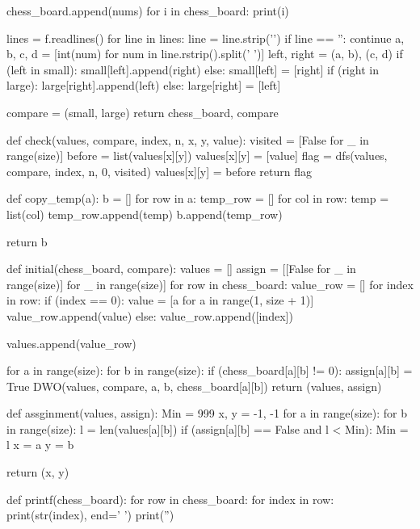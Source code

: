 ﻿\documentclass[a4paper, 11pt]{article}
\begin{document}
\begin{python}
        chess_board.append(nums)
    for i in chess_board:
        print(i)

    lines = f.readlines()
    for line in lines:
        line = line.strip('\n')
        if line == '':
            continue
        a, b, c, d = [int(num) for num in line.rstrip().split(' ')]
        left, right = (a, b), (c, d)
        if (left in small):
            small[left].append(right)
        else:
            small[left] = [right]
        if (right in large):
            large[right].append(left)
        else:
               large[right] = [left]

    compare = (small, large)
    return chess_board, compare


def check(values, compare, index, n, x, y, value):
    visited = [False for _ in range(size)]
    before = list(values[x][y])
    values[x][y] = [value]
    flag = dfs(values, compare, index, n, 0, visited)
    values[x][y] = before
    return flag



def copy_temp(a):
    b = []
    for row in a:
        temp_row = []
        for col in row:
            temp = list(col)
            temp_row.append(temp)
        b.append(temp_row)

    return b


def initial(chess_board, compare):
    values = []
    assign = [[False for _ in range(size)] for _ in range(size)]
    for row in chess_board:
        value_row = []
        for index in row:
            if (index == 0):
                value = [a for a in range(1, size + 1)]
                value_row.append(value)
            else:
                value_row.append([index])

        values.append(value_row)

    for a in range(size):
        for b in range(size):
            if (chess_board[a][b] != 0):
                assign[a][b] = True
                DWO(values, compare, a, b, chess_board[a][b])
    return (values, assign)


def assginment(values, assign):
    Min = 999
    x, y = -1, -1
    for a in range(size):
        for b in range(size):
            l = len(values[a][b])
            if (assign[a][b] == False and l < Min):
                Min = l
                x = a
                y = b

    return (x, y)


def printf(chess_board):
    for row in chess_board:
        for index in row:
            print(str(index), end=' ')
        print('')



\end{python}
\end{document}
